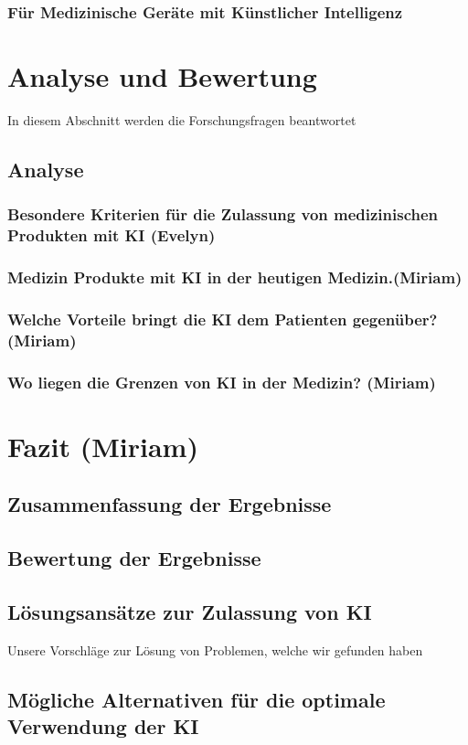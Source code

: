 \documentclass[a4paper, 12pt]{article}
\begin{document}
\subsubsection{Für Medizinische Geräte mit Künstlicher Intelligenz}


\section{Analyse und Bewertung}
In diesem Abschnitt werden die Forschungsfragen beantwortet
\subsection{Analyse}
\subsubsection{Besondere Kriterien für die Zulassung von medizinischen Produkten mit KI (Evelyn)}
\subsubsection{Medizin Produkte mit KI in der heutigen Medizin.(Miriam)}
\subsubsection{Welche Vorteile bringt die KI dem Patienten gegenüber? (Miriam)}
\subsubsection{Wo liegen die Grenzen von KI in der Medizin? (Miriam)}



\section{Fazit (Miriam)}
\subsection{Zusammenfassung der Ergebnisse}
\subsection{Bewertung der Ergebnisse}
\subsection{Lösungsansätze zur Zulassung von KI}
Unsere Vorschläge zur Lösung von Problemen, welche wir gefunden haben
\subsection{Mögliche Alternativen für die optimale Verwendung der KI}
\end{document}
